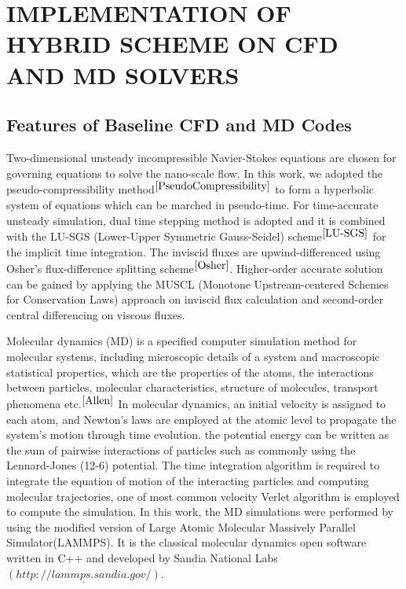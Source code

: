 \documentclass{CFD2010paper}
\begin{document}
\section{IMPLEMENTATION OF HYBRID SCHEME ON CFD AND MD SOLVERS}

\subsection{Features of Baseline CFD and MD Codes}
Two-dimensional unsteady incompressible Navier-Stokes equations are chosen for governing equations to solve the nano-scale flow. In this work, we adopted the pseudo-compressibility method$^{\cite{PseudoCompressibility}}$ to form a hyperbolic system of equations which can be marched in pseudo-time. For time-accurate unsteady simulation, dual time stepping method is adopted and it is combined with the LU-SGS (Lower-Upper Symmetric Gauss-Seidel) scheme$^{\cite{LU-SGS}}$ for the implicit time integration. The inviscid fluxes are upwind-differenced using Osher's flux-difference splitting scheme$^{\cite{Osher}}$. Higher-order accurate solution can be gained by applying the MUSCL (Monotone Upstream-centered Schemes for Conservation Laws) approach on inviscid flux calculation and second-order central differencing on viscous fluxes.


Molecular dynamics (MD) is a specified computer simulation method for molecular systems, including microscopic details of a system and macroscopic statistical properties, which are the properties of the atoms, the interactions between particles, molecular characteristics, structure of molecules, transport phenomena etc.$^{\cite{Allen}}$ In molecular dynamics, an initial velocity is assigned to each atom, and Newton's laws are employed at the atomic level to propagate the system's motion through time evolution. the potential energy can be written as the sum of pairwise interactions of particles such as commonly using the Lennard-Jones (12-6) potential. The time integration algorithm is required to integrate the equation of motion of the interacting particles and computing molecular trajectories, one of most common velocity Verlet algorithm is employed to compute the simulation.
In this work,  the MD simulations were performed by using the modified version of Large Atomic Molecular Massively Parallel Simulator(LAMMPS). It is the classical molecular dynamics open software written in C++ and developed by Sandia National Labs $\underline{(http://lammps.sandia.gov/)}$.
\end{document}

